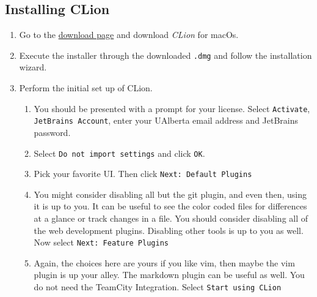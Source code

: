 \documentclass[../setup.tex]{subfiles}
\begin{document}
\subsection{Installing CLion}
\begin{enumerate}
  \item
    Go to the \href{https://www.jetbrains.com/clion/download/\#section=mac} {download page} and
    download \textit{CLion} for macOs.
  \item
    Execute the installer through the downloaded \lstinline{.dmg} and follow the installation
    wizard.
  \item
    Perform the initial set up of CLion.
    \begin{enumerate}
      \item
        You should be presented with a prompt for your license. Select \texttt{Activate},
        \texttt{JetBrains Account}, enter your UAlberta email address and JetBrains password.
      \item
        Select \texttt{Do not import settings} and click \texttt{OK}.
      \item
        Pick your favorite UI. Then click \texttt{Next: Default Plugins}
      \item
        You might consider disabling all but the git plugin, and even then, using it is up to you.
        It can be useful to see the color coded files for differences at a glance or track changes
        in a file. You should consider disabling all of the web development plugins. Disabling
        other tools is up to you as well. Now select \texttt{Next: Feature Plugins}
      \item
        Again, the choices here are yours if you like vim, then maybe the vim plugin is up your
        alley. The markdown plugin can be useful as well. You do not need the TeamCity Integration.
        Select \texttt{Start using CLion}
    \end{enumerate}
\end{enumerate}
\end{document}
